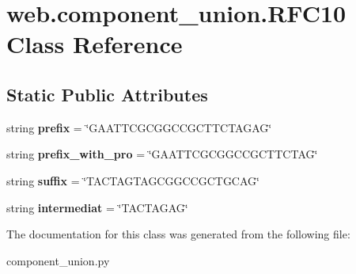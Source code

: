\hypertarget{classweb_1_1component__union_1_1_r_f_c10}{\section{web.\-component\-\_\-union.\-R\-F\-C10 Class Reference}
\label{classweb_1_1component__union_1_1_r_f_c10}
}
\subsection*{Static Public Attributes}
\begin{DoxyCompactItemize}
\item 
\hypertarget{classweb_1_1component__union_1_1_r_f_c10_a1d6b141c104e00fbca5eec8fbe28f32b}{string {\bfseries prefix} = \char`\"{}G\-A\-A\-T\-T\-C\-G\-C\-G\-G\-C\-C\-G\-C\-T\-T\-C\-T\-A\-G\-A\-G\char`\"{}}\label{classweb_1_1component__union_1_1_r_f_c10_a1d6b141c104e00fbca5eec8fbe28f32b}

\item 
\hypertarget{classweb_1_1component__union_1_1_r_f_c10_a0fbd566518fac8b5840641dd4d024860}{string {\bfseries prefix\-\_\-with\-\_\-pro} = \char`\"{}G\-A\-A\-T\-T\-C\-G\-C\-G\-G\-C\-C\-G\-C\-T\-T\-C\-T\-A\-G\char`\"{}}\label{classweb_1_1component__union_1_1_r_f_c10_a0fbd566518fac8b5840641dd4d024860}

\item 
\hypertarget{classweb_1_1component__union_1_1_r_f_c10_ac2650362ac0e37bbe76d7d2ca7c34d0a}{string {\bfseries suffix} = \char`\"{}T\-A\-C\-T\-A\-G\-T\-A\-G\-C\-G\-G\-C\-C\-G\-C\-T\-G\-C\-A\-G\char`\"{}}\label{classweb_1_1component__union_1_1_r_f_c10_ac2650362ac0e37bbe76d7d2ca7c34d0a}

\item 
\hypertarget{classweb_1_1component__union_1_1_r_f_c10_adb75408ad665c2677622cc29c836af11}{string {\bfseries intermediat} = \char`\"{}T\-A\-C\-T\-A\-G\-A\-G\char`\"{}}\label{classweb_1_1component__union_1_1_r_f_c10_adb75408ad665c2677622cc29c836af11}

\end{DoxyCompactItemize}


The documentation for this class was generated from the following file\-:\begin{DoxyCompactItemize}
\item 
component\-\_\-union.\-py\end{DoxyCompactItemize}
